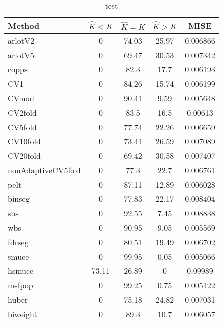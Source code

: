 \begin{table}[ht]
\centering
\begin{tabular}{l|cccc}
  \hline
Method & $\hat{K} < K$ & $\hat{K} = K$ & $\hat{K} > K$ & MISE \\ 
  \hline
arlotV2 &     0 & 74.03 & 25.97 & 0.006866 \\ 
  arlotV5 &     0 & 69.47 & 30.53 & 0.007342 \\ 
  copps &     0 &  82.3 &  17.7 & 0.006193 \\ 
  CV1 &     0 & 84.26 & 15.74 & 0.006199 \\ 
  CVmod &     0 & 90.41 &  9.59 & 0.005648 \\ 
  CV2fold &     0 &  83.5 &  16.5 & 0.00613 \\ 
  CV5fold &     0 & 77.74 & 22.26 & 0.006659 \\ 
  CV10fold &     0 & 73.41 & 26.59 & 0.007089 \\ 
  CV20fold &     0 & 69.42 & 30.58 & 0.007407 \\ 
  nonAdaptiveCV5fold &     0 &  77.3 &  22.7 & 0.006761 \\ 
  pelt &     0 & 87.11 & 12.89 & 0.006028 \\ 
  binseg &     0 & 77.83 & 22.17 & 0.008404 \\ 
  sbs &     0 & 92.55 &  7.45 & 0.008838 \\ 
  wbs &     0 & 90.95 &  9.05 & 0.005569 \\ 
  fdrseg &     0 & 80.51 & 19.49 & 0.006702 \\ 
  smuce &     0 & 99.95 &  0.05 & 0.005066 \\ 
  hsmuce & 73.11 & 26.89 &     0 & 0.09989 \\ 
  msfpop &     0 & 99.25 &  0.75 & 0.005122 \\ 
  huber &     0 & 75.18 & 24.82 & 0.007031 \\ 
  biweight &     0 &  89.3 &  10.7 & 0.006057 \\ 
   \hline
\end{tabular}
\caption{test} 
\end{table}
